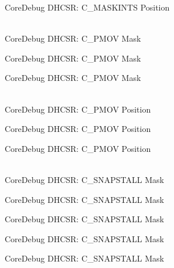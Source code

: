 \begin{DoxyRefList}
\label{deprecated__deprecated000586}%
%
Core\+Debug DHCSR:\+ C\+\_\+\+MASKINTS Position  
\item[{\parbox[t]{\linewidth}{Global \doxylink{group__CMSIS__SCB_ga6c41fddb98d97a17f3e9020278a1aed1}{Core\+Debug\+\_\+\+DHCSR\+\_\+\+C\+\_\+\+PMOV\+\_\+\+Msk} }}]\hfill \\
\label{deprecated__deprecated000030}%
%
Core\+Debug DHCSR:\+ C\+\_\+\+PMOV Mask 

\label{deprecated__deprecated000481}%
%
Core\+Debug DHCSR:\+ C\+\_\+\+PMOV Mask 

\label{deprecated__deprecated000583}%
%
Core\+Debug DHCSR:\+ C\+\_\+\+PMOV Mask  
\item[{\parbox[t]{\linewidth}{Global \doxylink{group__CMSIS__SCB_gac414659dd5c8bd9c91ab94441ded720a}{Core\+Debug\+\_\+\+DHCSR\+\_\+\+C\+\_\+\+PMOV\+\_\+\+Pos} }}]\hfill \\
\label{deprecated__deprecated000029}%
%
Core\+Debug DHCSR:\+ C\+\_\+\+PMOV Position 

\label{deprecated__deprecated000480}%
%
Core\+Debug DHCSR:\+ C\+\_\+\+PMOV Position 

\label{deprecated__deprecated000582}%
%
Core\+Debug DHCSR:\+ C\+\_\+\+PMOV Position  
\item[{\parbox[t]{\linewidth}{Global \doxylink{group__CMSIS__CoreDebug_ga53aa99b2e39a67622f3b9973e079c2b4}{Core\+Debug\+\_\+\+DHCSR\+\_\+\+C\+\_\+\+SNAPSTALL\+\_\+\+Msk} }}]\hfill \\
\label{deprecated__deprecated000032}%
%
Core\+Debug DHCSR:\+ C\+\_\+\+SNAPSTALL Mask 

\label{deprecated__deprecated000176}%
%
Core\+Debug DHCSR:\+ C\+\_\+\+SNAPSTALL Mask 

\label{deprecated__deprecated000318}%
%
Core\+Debug DHCSR:\+ C\+\_\+\+SNAPSTALL Mask 

\label{deprecated__deprecated000394}%
%
Core\+Debug DHCSR:\+ C\+\_\+\+SNAPSTALL Mask 

\label{deprecated__deprecated000483}%
%
Core\+Debug DHCSR:\+ C\+\_\+\+SNAPSTALL Mask 


\end{DoxyRefList}
